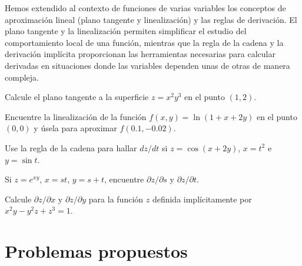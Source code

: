 Hemos extendido al contexto de funciones de varias variables los conceptos de aproximación lineal (plano tangente y linealización) y las reglas de derivación. El plano tangente y la linealización permiten simplificar el estudio del comportamiento local de una función, mientras que la regla de la cadena y la derivación implícita proporcionan las herramientas necesarias para calcular derivadas en situaciones donde las variables dependen unas de otras de manera compleja.

\begin{prob}
Calcule el plano tangente a la superficie $z = x^2 y^3$ en el punto $(1, 2)$.
\end{prob}

\begin{prob}
Encuentre la linealización de la función $f(x, y) = \ln(1 + x + 2y)$ en el punto $(0, 0)$ y úsela para aproximar $f(0.1, -0.02)$.
\end{prob}

\begin{prob}
Use la regla de la cadena para hallar $dz/dt$ si $z = \cos(x + 2y)$, $x = t^2$ e $y = \sin t$.
\end{prob}

\begin{prob}
Si $z = e^{xy}$, $x = s t$, $y = s + t$, encuentre $\partial z/\partial s$ y $\partial z/\partial t$.
\end{prob}

\begin{prob}
Calcule $\partial z/\partial x$ y $\partial z/\partial y$ para la función $z$ definida implícitamente por $x^2 y - y^2 z + z^3 = 1$.
\end{prob}

\section{Problemas propuestos} 


